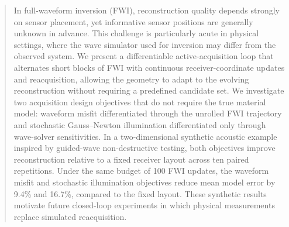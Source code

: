 \documentclass{article}
\begin{document}
\begin{abstract}




In full-waveform inversion (FWI), reconstruction quality depends strongly on sensor placement, yet informative sensor positions are generally unknown in advance. This challenge is particularly acute in physical settings, where the wave simulator used for inversion may differ from the observed system. We present a differentiable active-acquisition loop that alternates short blocks of FWI with continuous receiver-coordinate updates and reacquisition, allowing the geometry to adapt to the evolving reconstruction without requiring a predefined candidate set. We investigate two acquisition design objectives that do not require the true
material model: waveform misfit differentiated through the unrolled FWI
trajectory and stochastic Gauss--Newton illumination differentiated only through
wave-solver sensitivities. In a two-dimensional synthetic acoustic example
inspired by guided-wave non-destructive testing, both objectives improve
reconstruction relative to a fixed receiver layout across ten paired
repetitions. Under the same budget of 100 FWI updates, the waveform misfit and
stochastic illumination objectives reduce mean model error by 9.4\% and 16.7\%,
compared to the fixed layout. These synthetic results motivate future closed-loop experiments in which physical measurements replace simulated reacquisition.

\end{abstract}








\clearpage


\end{document}
